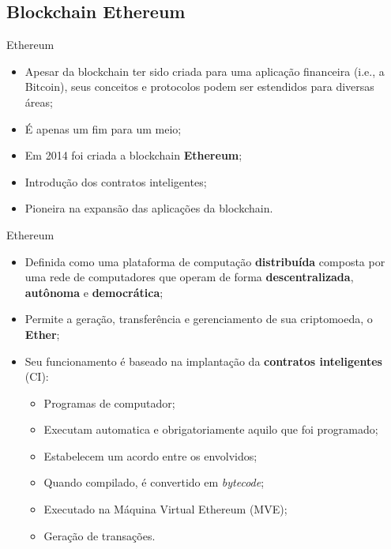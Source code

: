 
\subsection{Blockchain Ethereum}

\begin{frame}{Ethereum}
    \begin{block}{}
    \begin{itemize}
        \item Apesar da blockchain ter sido criada para uma aplicação financeira (i.e., a Bitcoin), seus conceitos e protocolos podem ser estendidos para diversas áreas;
        \item É apenas um fim para um meio;
    \end{itemize}
    \end{block}
    \begin{block}{}
    \begin{itemize}
        \item Em 2014 foi criada a blockchain \textbf{Ethereum};
        \item Introdução dos contratos inteligentes;
        \item Pioneira na expansão das aplicações da blockchain.
    \end{itemize}
    \end{block}
\end{frame}

\begin{frame}{Ethereum}
    \begin{itemize}
        \item Definida como uma plataforma de computação \textbf{distribuída} composta por uma rede de computadores que operam de forma \textbf{descentralizada}, \textbf{autônoma} e \textbf{democrática};
        \item Permite a geração, transferência e gerenciamento de sua criptomoeda, o \textbf{Ether};
        \item Seu funcionamento é baseado na implantação da \textbf{contratos inteligentes} (CI):
        \begin{itemize}
            \item Programas de computador;
            \item Executam automatica e obrigatoriamente aquilo que foi programado;
            \item Estabelecem um acordo entre os envolvidos;
            \item Quando compilado, é convertido em \textit{bytecode};
            \item Executado na Máquina Virtual Ethereum (MVE);
            \item Geração de transações.
        \end{itemize}
    \end{itemize}
\end{frame} 

